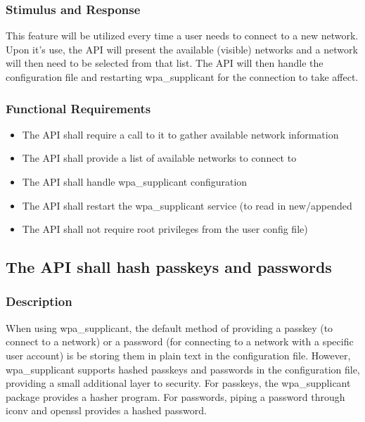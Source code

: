 \subsubsection{Stimulus and Response}
This feature will be utilized every time a user needs to connect to a new network.
Upon it's use, the API will present the available (visible) networks and a network
will then need to be selected from that list. The API will then handle the configuration
file and restarting wpa\_supplicant for the connection to take affect.

\subsubsection{Functional Requirements}

\begin{itemize}
  \item The API shall require a call to it to gather available network information
  \item The API shall provide a list of available networks to connect to
  \item The API shall handle wpa\_supplicant configuration
  \item The API shall restart the wpa\_supplicant service (to read in new/appended 
  \item The API shall not require root privileges from the user
    config file)
\end{itemize}


\subsection{The API shall hash passkeys and passwords}
\subsubsection{Description}
When using wpa\_supplicant, the default method of providing a passkey (to connect
to a network) or a password (for connecting to a network with a specific user account)
is be storing them in plain text in the configuration file. However, wpa\_supplicant
supports hashed passkeys and passwords in the configuration file, providing a
small additional layer to security. For passkeys, the wpa\_supplicant package provides
a hasher program. For passwords, piping a password through iconv and openssl provides
a hashed password.

